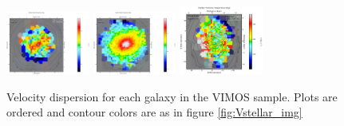 \begin{figure}
      \includegraphics[width=0.245\textwidth]{Vmaps/ic1531_stellar_sigma.png}
      \includegraphics[width=0.245\textwidth]{Vmaps/ngc1399_stellar_sigma.png}
      \includegraphics[width=0.245\textwidth]{Vmaps/eso443-g024_stellar_sigma.png}
      \caption[VIMOS velocity dispersion]{Velocity dispersion for each galaxy in the VIMOS sample. Plots are ordered and contour colors are as in figure \ref{fig:Vstellar_img}}
      \label{fig:Vstellar_sigma}
\end{figure}


